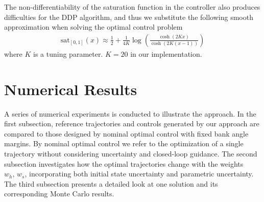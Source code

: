 \documentclass[journal ]{new-aiaa}
\begin{document}
The non-differentiability of the saturation function in the controller also produces difficulties for the DDP algorithm, and thus we substitute the following smooth approximation when solving the optimal control problem
\begin{align*}
\mathrm{sat}_{[0,1]}(x) \approx \frac{1}{2} + \frac{1}{4K}\log\left(\frac{\cosh (2Kx)}{\cosh (2K(x-1))}\right) 
\end{align*}
where $K$ is a tuning parameter. $K=20$ in our implementation.


\section*{Numerical Results}
A series of numerical experiments is conducted to illustrate the approach. In the first subsection, reference trajectories and controls generated by our approach are compared to those designed by nominal optimal control with fixed bank angle margins. By nominal optimal control we refer to the optimization of a single trajectory without considering uncertainty and closed-loop guidance. The second subsection investigates how the optimal trajectories change with the weights $w_h,\,w_s$, incorporating both initial state uncertainty and parametric uncertainty. The third subsection presents a detailed look at one solution and its corresponding Monte Carlo results.
\end{document}
